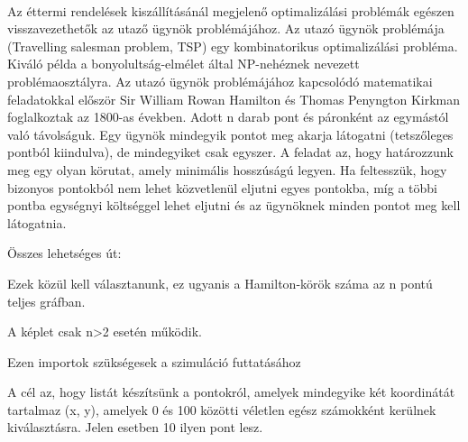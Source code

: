 \documentclass[12pt,a4paper]{article}
\begin{document}
\begin{flushleft}
\\
\end{flushleft}

Az éttermi rendelések kiszállításánál megjelenő optimalizálási problémák egészen visszavezethetők az utaző ügynök problémájához. Az utazó ügynök problémája (Travelling salesman problem, TSP) egy kombinatorikus optimalizálási probléma. Kiváló példa a bonyolultság-elmélet által NP-nehéznek nevezett problémaosztályra. Az utazó ügynök problémájához kapcsolódó matematikai feladatokkal először Sir William Rowan Hamilton és Thomas Penyngton Kirkman foglalkoztak az 1800-as években. Adott n darab pont és páronként az egymástól való távolságuk. Egy ügynök mindegyik pontot meg akarja látogatni (tetszőleges pontból kiindulva), de mindegyiket csak egyszer. A feladat az, hogy határozzunk meg egy olyan körutat, amely minimális hosszúságú legyen. Ha feltesszük, hogy bizonyos pontokból nem lehet közvetlenül eljutni egyes pontokba, míg a többi pontba egységnyi költséggel lehet eljutni és az ügynöknek minden pontot meg kell látogatnia.  \\

\begin{center}
Összes lehetséges út:
\end{center}

\begin{center}
 \hspace{1}
\end{center}
Ezek közül kell választanunk, ez ugyanis a Hamilton-körök száma az n pontú teljes gráfban. \\

\begin{flushleft}
A képlet csak n>2 esetén működik.
\end{flushleft}


Ezen importok szükségesek a szimuláció futtatásához

\begin{flushleft}
\begin{listings [frame=single]}
{\textit{import random, numpy, math, copy, matplotlib.pyplot as plt, pandas as pd \\
from scipy.spatial import distance\_matrix}
\end{listings}
\end{flushleft}


A cél az, hogy listát készítsünk a pontokról, amelyek mindegyike két koordinátát tartalmaz (x, y), amelyek 0 és 100 közötti véletlen egész számokként kerülnek kiválasztásra. Jelen esetben 10 ilyen pont lesz.
\end{document}
